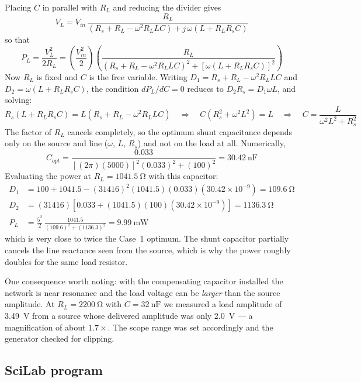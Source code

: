 \documentclass[11pt]{article}
\begin{document}
Placing $C$ in parallel with $R_L$ and reducing the divider gives
\[
    V_L = V_{in}\,\frac{R_L}
        {(R_s + R_L - \omega^2 R_L L C) + j\,\omega(L + R_L R_s C)}
\]
so that
\[
    P_L = \frac{V_L^2}{2R_L}
        = \left(\frac{V_{in}^2}{2}\right)
          \left(\frac{R_L}
          {(R_s + R_L - \omega^2 R_L L C)^2 + \left[\omega(L + R_L R_s C)\right]^2}\right)
\]
Now $R_L$ is fixed and $C$ is the free variable. Writing
$D_1 = R_s + R_L - \omega^2 R_L L C$ and $D_2 = \omega(L + R_L R_s C)$, the
condition $dP_L/dC = 0$ reduces to $D_2 R_s = D_1 \omega L$, and solving:
\[
    R_s(L + R_L R_s C) = L(R_s + R_L - \omega^2 R_L L C)
    \quad\Longrightarrow\quad
    C\left(R_s^2 + \omega^2 L^2\right) = L
    \quad\Longrightarrow\quad
    C = \frac{L}{\omega^2 L^2 + R_s^2}
\]
The factor of $R_L$ cancels completely, so the optimum shunt capacitance
depends only on the source and line ($\omega$, $L$, $R_s$) and not on the load
at all. Numerically,
\[
    C_{opt} = \frac{0.033}{\left[(2\pi)(5000)\right]^2(0.033)^2 + (100)^2}
            = \SI{30.42}{\nano\farad}
\]
Evaluating the power at $R_L = \SI{1041.5}{\ohm}$ with this capacitor:
\begin{align*}
    D_1 &= 100 + 1041.5 - (31416)^2(1041.5)(0.033)(30.42\times10^{-9})
         = \SI{109.6}{\ohm} \\
    D_2 &= (31416)\left[0.033 + (1041.5)(100)(30.42\times10^{-9})\right]
         = \SI{1136.3}{\ohm} \\
    P_L &= \frac{5^2}{2}\,\frac{1041.5}{(109.6)^2 + (1136.3)^2}
         = \SI{9.99}{\milli\watt}
\end{align*}
which is very close to twice the Case~1 optimum. The shunt capacitor partially
cancels the line reactance seen from the source, which is why the power roughly
doubles for the same load resistor.

One consequence worth noting: with the compensating capacitor installed the
network is near resonance and the load voltage can be \emph{larger} than the
source amplitude. At $R_L = \SI{2200}{\ohm}$ with $C = \SI{32}{\nano\farad}$ we
measured a load amplitude of \SI{3.49}{\volt} from a source whose delivered
amplitude was only \SI{2.0}{\volt} --- a magnification of about $1.7\times$. The
scope range was set accordingly and the generator checked for clipping.

\subsection*{SciLab program}
\end{document}
